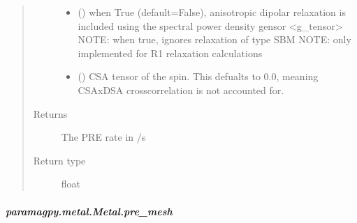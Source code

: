 \documentclass[a4paper,10pt,english,openany,oneside]{sphinxmanual}
\begin{document}
\begin{fulllineitems}
\begin{fulllineitems}
\begin{fulllineitems}
\begin{quote}
\begin{description}
\begin{itemize}
\item {} 
\sphinxAtStartPar
{} (\sphinxstyleliteralemphasis{\sphinxupquote{ (}}\sphinxstyleliteralemphasis{\sphinxupquote{)}}) \textendash{} when True (default=False), anisotropic dipolar relaxation is
included using the spectral power density gensor \textless{}g\_tensor\textgreater{}
NOTE: when true, ignores relaxation of type SBM
NOTE: only implemented for R1 relaxation calculations

\item {} 
\sphinxAtStartPar
{} (\sphinxstyleliteralemphasis{\sphinxupquote{ (}}\sphinxstyleliteralemphasis{\sphinxupquote{,}}\sphinxstyleliteralemphasis{\sphinxupquote{) }}\sphinxstyleliteralemphasis{\sphinxupquote{(}}\sphinxstyleliteralemphasis{\sphinxupquote{)}}) \textendash{} CSA tensor of the spin.
This defualts to 0.0, meaning CSAxDSA crosscorrelation is
not accounted for.

\end{itemize}

\item[{Returns}] \leavevmode
\sphinxAtStartPar
{} \textendash{} The PRE rate in /s

\item[{Return type}] \leavevmode
\sphinxAtStartPar
float

\end{description}\end{quote}

\end{fulllineitems}



\subparagraph{paramagpy.metal.Metal.pre\_mesh}
\label{\detokenize{reference/generated/paramagpy.metal.Metal.pre_mesh:paramagpy-metal-metal-pre-mesh}}\label{\detokenize{reference/generated/paramagpy.metal.Metal.pre_mesh::doc}}


\end{fulllineitems}
\end{fulllineitems}
\end{document}
